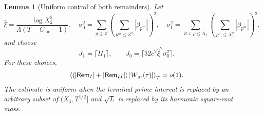\documentclass[11pt,reqno]{amsart}
\numberwithin{equation}{section}
\newtheorem{lemma}[theorem]{Lemma}
\newcommand{\av}[1]{\left\langle #1\right\rangle_T}
\newcommand{\Cloc}{C_{\mathrm{loc}}}
\begin{document}
\begin{lemma}[Uniform control of both remainders]\label{lem:aggerrors}
Let
\begin{equation}\label{eq:aggparameters}
\widehat\xi=\frac{\log X_2^2}{\Lambda(T-\Cloc-1)},
\quad \sigma_0^2=\sum_{p\le Z}
\left(\sum_{p^m\le Z^2}|\beta_{p^m}|\right)^2,
\quad \sigma_1^2=\sum_{Z<p\le X_1}
\left(\sum_{p^m\le X_1^2}|\beta_{p^m}|\right)^2,
\end{equation}
and choose
\[
J_1=\lceil H_1\rceil,\qquad
J_0=\lceil32e^2\widehat\xi^2\sigma_0^2\rceil.
\]
For these choices,
\begin{equation}\label{eq:aggerrors}
\av{\left(|\mathsf{Rem}_I|+|\mathsf{Rem}_{II}|\right)
 |W_{\rm pr}(\tau)|}=o(1).
\end{equation}
The estimate is uniform when the terminal prime interval is replaced
by an arbitrary subset of $(X_1,T^{1/2}]$ and
$\sqrt L$ is replaced by its harmonic square-root mass.
\end{lemma}
\end{document}
